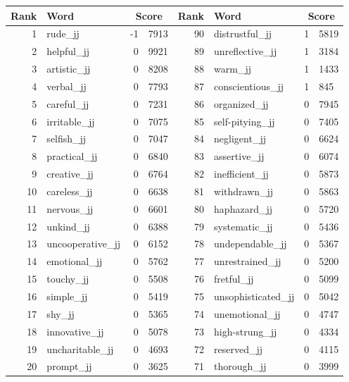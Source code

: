 \begin{table}[tbp]
    \begin{tabular}{| rlr@{.}l | rlr@{.}l |}
    \hline
    \textbf{Rank} & \textbf{Word} & \multicolumn{2}{c|}{\textbf{Score}} & \textbf{Rank} & \textbf{Word} & \multicolumn{2}{c|}{\textbf{Score}} \\
    \hline
    1 & rude\_jj & -1 & 7913    &    90 & distrustful\_jj & 1 & 5819 \\
    2 & helpful\_jj & 0 & 9921    &    89 & unreflective\_jj & 1 & 3184 \\
    3 & artistic\_jj & 0 & 8208    &    88 & warm\_jj & 1 & 1433 \\
    4 & verbal\_jj & 0 & 7793    &    87 & conscientious\_jj & 1 & 845 \\
    5 & careful\_jj & 0 & 7231    &    86 & organized\_jj & 0 & 7945 \\
    6 & irritable\_jj & 0 & 7075    &    85 & self-pitying\_jj & 0 & 7405 \\
    7 & selfish\_jj & 0 & 7047    &    84 & negligent\_jj & 0 & 6624 \\
    8 & practical\_jj & 0 & 6840    &    83 & assertive\_jj & 0 & 6074 \\
    9 & creative\_jj & 0 & 6764    &    82 & inefficient\_jj & 0 & 5873 \\
    10 & careless\_jj & 0 & 6638    &    81 & withdrawn\_jj & 0 & 5863 \\
    11 & nervous\_jj & 0 & 6601    &    80 & haphazard\_jj & 0 & 5720 \\
    12 & unkind\_jj & 0 & 6388    &    79 & systematic\_jj & 0 & 5436 \\
    13 & uncooperative\_jj & 0 & 6152    &    78 & undependable\_jj & 0 & 5367 \\
    14 & emotional\_jj & 0 & 5762    &    77 & unrestrained\_jj & 0 & 5200 \\
    15 & touchy\_jj & 0 & 5508    &    76 & fretful\_jj & 0 & 5099 \\
    16 & simple\_jj & 0 & 5419    &    75 & unsophisticated\_jj & 0 & 5042 \\
    17 & shy\_jj & 0 & 5365    &    74 & unemotional\_jj & 0 & 4747 \\
    18 & innovative\_jj & 0 & 5078    &    73 & high-strung\_jj & 0 & 4334 \\
    19 & uncharitable\_jj & 0 & 4693    &    72 & reserved\_jj & 0 & 4115 \\
    20 & prompt\_jj & 0 & 3625    &    71 & thorough\_jj & 0 & 3999 \\

\end{tabular}
\end{table}
